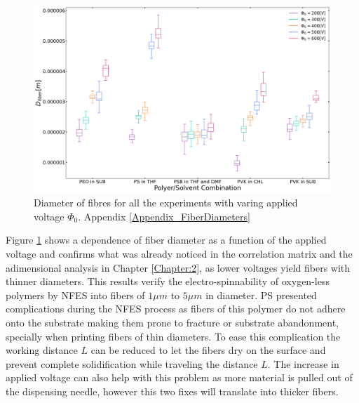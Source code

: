 \begin{figure}[!th]
\centering
\includegraphics[width=\textwidth]{./Figures/boxplotsFiberDiameter.png}
\decoRule
\caption[Diameter of fibres for all the experiments]{Diameter of fibres for all the experiments with varing applied voltage $\Phi_0$. Appendix \ref{Appendix_FiberDiameters}}
\label{fig:boxplotsFiberDiameter}
\end{figure}

Figure \ref{fig:boxplotsFiberDiameter} shows a dependence of fiber diameter as a function of the applied voltage and confirms what was already noticed in the correlation matrix and the adimensional analysis in Chapter \ref{Chapter:2}, as lower voltages yield fibers with thinner diameters. This results verify the electro-spinnability of oxygen-less polymers by NFES into fibers of $1 \mu m$ to $5 \mu m$ in diameter. PS presented complications during the NFES process as fibers of this polymer do not adhere onto the substrate making them prone to fracture or substrate abandonment, specially when printing fibers of thin diameters. To ease this complication the working distance $L$ can be reduced to let the fibers dry on the surface and prevent complete solidification while traveling the distance $L$. The increase in applied voltage can also help with this problem as more material is pulled out of the dispensing needle, however this two fixes will translate into thicker fibers.


